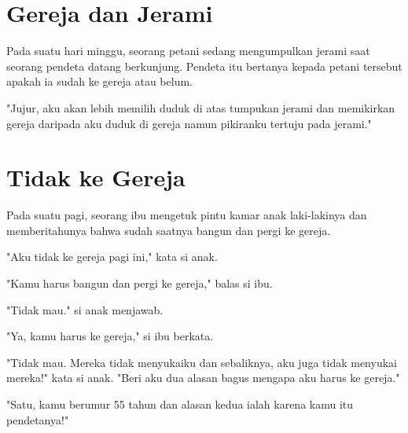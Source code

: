 
\section*{Gereja dan Jerami}
\setlength{\parindent}{0cm}

Pada suatu hari minggu, seorang petani sedang mengumpulkan jerami saat
seorang pendeta datang berkunjung. Pendeta itu bertanya kepada petani
tersebut apakah ia sudah ke gereja atau belum.

"Jujur, aku akan lebih memilih duduk di atas tumpukan jerami dan
memikirkan gereja daripada aku duduk di gereja namun pikiranku tertuju
pada jerami."


\section*{Tidak ke Gereja}

Pada suatu pagi, seorang ibu mengetuk pintu kamar anak laki-lakinya
dan memberitahunya bahwa sudah saatnya bangun dan pergi ke gereja.

"Aku tidak ke gereja pagi ini," kata si anak.

"Kamu harus bangun dan pergi ke gereja," balas si ibu.

"Tidak mau." si anak menjawab.

"Ya, kamu harus ke gereja," si ibu berkata.

"Tidak mau. Mereka tidak menyukaiku dan sebaliknya, aku juga tidak
menyukai mereka!" kata si anak. "Beri aku dua alasan bagus mengapa aku
harus ke gereja."

"Satu, kamu berumur 55 tahun dan alasan kedua ialah karena kamu itu
pendetanya!"

\setlength{\parindent}{1cm}
\normalsize